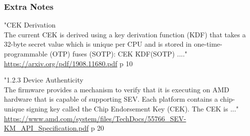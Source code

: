 \subsubsection*{Extra Notes}
"CEK Derivation\\
The current CEK is derived using a key derivation function (KDF) that takes a 32-byte secret value which is unique per CPU and is stored in one-time-programmable (OTP) fuses (SOTP): CEK \= KDF(SOTP) ...."
\url{https://arxiv.org/pdf/1908.11680.pdf} p 10

"1.2.3 Device Authenticity\\
The firmware provides a mechanism to verify that it is executing on AMD hardware that is capable of supporting SEV. Each platform contains a chip-unique signing key called the Chip Endorsement Key (CEK). The CEK is ..."
\url{https://www.amd.com/system/files/TechDocs/55766_SEV-KM_API_Specification.pdf} p 20
